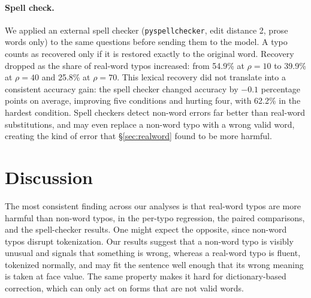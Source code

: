\documentclass[11pt]{article}
\begin{document}
\paragraph{Spell check.}
We applied an external spell checker (\texttt{pyspellchecker}, edit distance 2,
prose words only) to the same questions before sending them to the model. A
typo counts as recovered only if it is restored exactly to the original word.
Recovery dropped as the share of real-word typos increased: from 54.9\% at
$\rho{=}10$ to 39.9\% at $\rho{=}40$ and 25.8\% at $\rho{=}70$. This lexical
recovery did not translate into a consistent accuracy gain: the spell checker
changed accuracy by $-0.1$ percentage points on average, improving five
conditions and hurting four, with 62.2\% in the hardest condition. Spell
checkers detect non-word errors far better than real-word substitutions, and
may even replace a non-word typo with a wrong valid word, creating the kind of
error that \S\ref{sec:realword} found to be more harmful.

\begin{table}[t]
\centering
\footnotesize
\setlength{\tabcolsep}{4pt}

\caption{GSM8K answered-only accuracy (\%) under each mitigation, per
configuration, with the change against the unmodified prompt (\emph{no fix}).
The mean row is taken over the nine typo configurations.}
\label{tab:fixes}
\end{table}

\section{Discussion}

The most consistent finding across our analyses is that real-word typos are more
harmful than non-word typos, in the per-typo regression, the paired comparisons,
and the spell-checker results. One might expect the opposite, since non-word
typos disrupt tokenization. Our results suggest that a non-word typo is visibly
unusual and signals that something is wrong, whereas a real-word typo is fluent,
tokenized normally, and may fit the sentence well enough that its wrong meaning
is taken at face value. The same property makes it hard for dictionary-based
correction, which can only act on forms that are not valid words.
\end{document}

